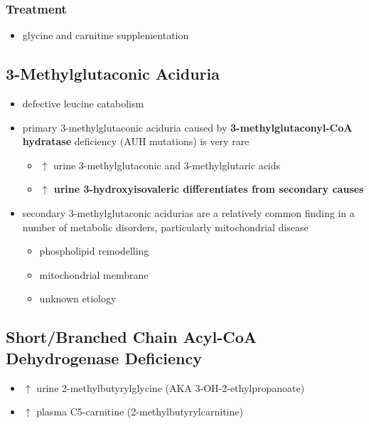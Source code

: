 \documentclass[12pt]{scrartcl}
\begin{document}
\subsubsection{Treatment}
\label{sec:org27ee47f}
\begin{itemize}
\item glycine and carnitine supplementation
\end{itemize}

\subsection{3-Methylglutaconic Aciduria}
\label{sec:org19f8c91}
\begin{itemize}
\item defective leucine catabolism
\item primary 3-methylglutaconic aciduria caused by \textbf{3-methylglutaconyl-CoA}
\textbf{hydratase} deficiency (AUH mutations) is very rare
\begin{itemize}
\item \(\uparrow\) urine 3-methylglutaconic and 3-methylglutaric acids
\item \textbf{\(\uparrow\) urine 3-hydroxyisovaleric differentiates from secondary causes}
\end{itemize}
\end{itemize}


\begin{itemize}
\item secondary 3-methylglutaconic acidurias are a relatively common finding in a
number of metabolic disorders, particularly mitochondrial disease
\begin{itemize}
\item phospholipid remodelling
\item mitochondrial membrane
\item unknown etiology
\end{itemize}
\end{itemize}

\subsection{Short/Branched Chain Acyl-CoA Dehydrogenase Deficiency}
\label{sec:orgb7c39f1}
\begin{itemize}
\item \(\uparrow\)  urine 2-methylbutyrylglycine (AKA 3-OH-2-ethylpropanoate)
\item \(\uparrow\)  plasma C5-carnitine (2-methylbutyrylcarnitine)
\end{itemize}
\end{document}
